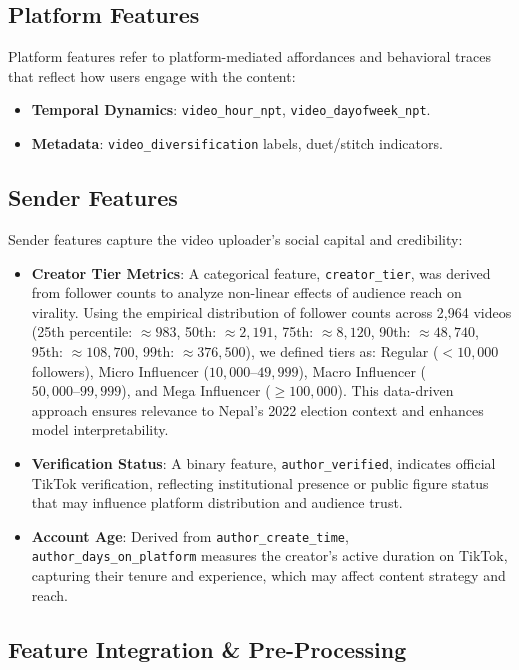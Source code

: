 \documentclass[12pt,a4paper]{report}
\begin{document}
\subsection{Platform Features}
Platform features refer to platform-mediated affordances and behavioral traces that reflect how users engage with the content:

\begin{itemize}
    \item \textbf{Temporal Dynamics}: \texttt{video\_hour\_npt}, \texttt{video\_dayofweek\_npt}.
    \item \textbf{Metadata}: \texttt{video\_diversification} labels, duet/stitch indicators.
\end{itemize}

\subsection{Sender Features}

Sender features capture the video uploader’s social capital and credibility:

\begin{itemize}
    \item \textbf{Creator Tier Metrics}: A categorical feature, \texttt{creator\_tier}, was derived from follower counts to analyze non-linear effects of audience reach on virality. Using the empirical distribution of follower counts across 2,964 videos (25th percentile: $\approx 983$, 50th: $\approx 2,191$, 75th: $\approx 8,120$, 90th: $\approx 48,740$, 95th: $\approx 108,700$, 99th: $\approx 376,500$), we defined tiers as: Regular ($< 10,000$ followers), Micro Influencer ($10,000–49,999$), Macro Influencer ($50,000–99,999$), and Mega Influencer ($\geq 100,000$). This data-driven approach ensures relevance to Nepal’s 2022 election context and enhances model interpretability.
\newpage
    \item \textbf{Verification Status}: A binary feature, \texttt{author\_verified}, indicates official TikTok verification, reflecting institutional presence or public figure status that may influence platform distribution and audience trust.
    
    \item \textbf{Account Age}: Derived from \texttt{author\_create\_time}, \texttt{author\_days\_on\_platform} measures the creator’s active duration on TikTok, capturing their tenure and experience, which may affect content strategy and reach.
\end{itemize}
\subsection{Feature Integration \& Pre-Processing}
\end{document}
